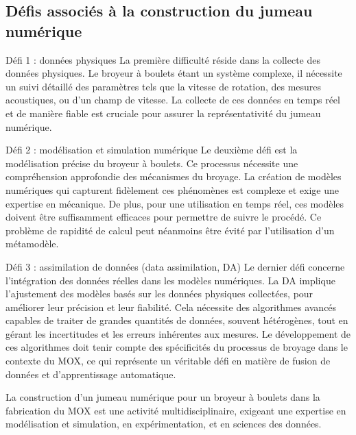 \subsection{Défis associés à la construction du jumeau numérique}
Défi 1 : données physiques
La première difficulté réside dans la collecte des données physiques. Le broyeur à boulets étant un système complexe, il nécessite un suivi détaillé des paramètres tels que la vitesse de rotation, des mesures acoustiques, ou d'un champ de vitesse. La collecte de ces données en temps réel et de manière fiable est cruciale pour assurer la représentativité du jumeau numérique.

Défi 2 : modélisation et simulation numérique
Le deuxième défi est la modélisation précise du broyeur à boulets. Ce processus nécessite une compréhension approfondie des mécanismes du broyage. La création de modèles numériques qui capturent fidèlement ces phénomènes est complexe et exige une expertise en mécanique. De plus, pour une utilisation en temps réel, ces modèles doivent être suffisamment efficaces pour permettre de suivre le procédé. Ce problème de rapidité de calcul peut néanmoins être évité par l'utilisation d'un métamodèle.

Défi 3 : assimilation de données (data assimilation, DA)
Le dernier défi concerne l'intégration des données réelles dans les modèles numériques. La DA implique l'ajustement des modèles basés sur les données physiques collectées, pour améliorer leur précision et leur fiabilité. Cela nécessite des algorithmes avancés capables de traiter de grandes quantités de données, souvent hétérogènes, tout en gérant les incertitudes et les erreurs inhérentes aux mesures. Le développement de ces algorithmes doit tenir compte des spécificités du processus de broyage dans le contexte du MOX, ce qui représente un véritable défi en matière de fusion de données et d'apprentissage automatique.

La construction d'un jumeau numérique pour un broyeur à boulets dans la fabrication du MOX est une activité multidisciplinaire, exigeant une expertise en modélisation et simulation, en expérimentation, et en sciences des données.